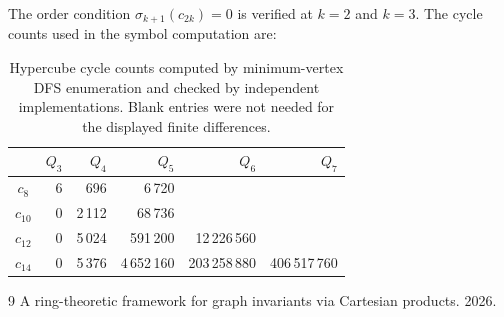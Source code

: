 \documentclass[11pt]{amsart}
\theoremstyle{definition}
\theoremstyle{remark}
\begin{document}
The order condition $\sigma_{k+1}(c_{2k})=0$ is verified at $k=2$ and $k=3$. The cycle counts used in the symbol computation are:
\begin{table}[h]
\centering
\begin{tabular}{c|rrrrr}
&$Q_3$&$Q_4$&$Q_5$&$Q_6$&$Q_7$\\ \hline
$c_8$&6&696&6\,720&&\\
$c_{10}$&0&2\,112&68\,736&&\\
$c_{12}$&0&5\,024&591\,200&12\,226\,560&\\
$c_{14}$&0&5\,376&4\,652\,160&203\,258\,880&406\,517\,760
\end{tabular}
\caption{Hypercube cycle counts computed by minimum-vertex DFS enumeration and checked by independent implementations. Blank entries were not needed for the displayed finite differences.}
\end{table}

\begin{thebibliography}{9}
 A ring-theoretic framework for graph invariants via Cartesian products. 2026.
\end{thebibliography}
\end{document}
